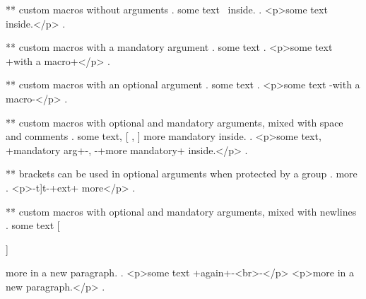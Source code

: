** custom macros without arguments
.
some text \empty\ inside.
.
<p>some text ​ inside.</p>
.

** custom macros with a mandatory argument
.
some text 
.
<p>some text +with a macro+</p>
.

** custom macros with an optional argument
.
some text 
.
<p>some text -with a macro-</p>
.


** custom macros with optional and mandatory arguments, mixed with space and comments
.
some text,  [%
,  %
 ]
 {more mandatory} inside.
.
<p>some text, +mandatory arg+-, -+more mandatory+ inside.</p>
.


** brackets can be used in optional arguments when protected by a group
.
\echoOGO[{t]}t]{ext} more
.
<p>-t]t-+ext+ more</p>
.



** custom macros with optional and mandatory arguments, mixed with newlines
.
some text  [ %

 ]%

  {more} in a new paragraph.
.
<p>some text +again+-<br>-</p>
<p>more​ in a new paragraph.</p>
.
